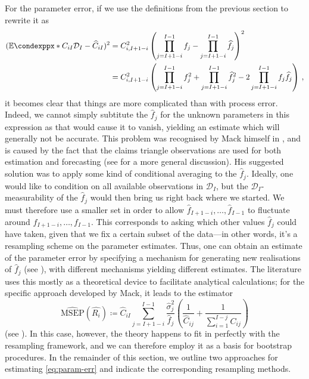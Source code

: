 \documentclass[a4paper]{book}
\begin{document}
For the parameter error, if we use the definitions from the previous section to rewrite it as
\begin{align} \label{eq:param-err}
  (\condexpp*{C_{iI}}{\mathcal{D}_I} - \widehat{C}_{iI})^2 &= C^2_{i, I+1-i} \left( \prod_{j=I+1-i}^{I-1}f_j - \prod_{j=I+1-i}^{I-1}\widehat{f}_j \right)^2 \\
  &= C^2_{i, I+1-i} \left( \prod_{j=I+1-i}^{I-1}f^2_j + \prod_{j=I+1-i}^{I-1}\widehat{f}^2_j - 2 \prod_{j=I+1-i}^{I-1}f_j \widehat{f}_j \right) \,,
\end{align}
it becomes clear that things are more complicated than with process error. Indeed, we cannot simply subtitute the $\widehat{f}_j$ for the unknown parameters in this expression as that would cause it to vanish, yielding an estimate which will generally not be accurate. This problem was recognised by Mack himself in \cite{mack:chain-ladder-variability}, and is caused by the fact that the claims triangle observations are used for both estimation and forecasting (see \cite[Section 2]{lindholm:msep} for a more general discussion). His suggested solution was to apply some kind of conditional averaging to the $\widehat{f}_j$. Ideally, one would like to condition on all available observations in $\mathcal{D}_I$, but the $\mathcal{D}_I$-measurability of the $\widehat{f}_j$ would then bring us right back where we started. We must therefore use a smaller set in order to allow $\widehat{f}_{I + 1 - i}, \dots, \widehat{f}_{I - 1}$ to fluctuate around $f_{I + 1 - i}, \dots, f_{I - 1}$. This corresponds to asking which other values $\widehat{f}_j$ could have taken, given that we fix a certain subset of the data---in other words, it's a resampling scheme on the parameter estimates. Thus, one can obtain an estimate of the parameter error by specifying a mechanism for generating new realisations of $\widehat{f}_j$ (see \cites{wuthrich:chain-ladder-msep}[44 \psqq]{wuthrich:stochastic-reserving}), with different mechanisms yielding different estimates. The literature uses this mostly as a theoretical device to facilitate analytical calculations; for the specific approach developed by Mack, it leads to the estimator
\begin{equation} \label{eq:mack-msep-estimator}
  \widehat{\mathrm{MSEP}}(\widehat{R_i}) \coloneqq \widehat{C}_{iI} \sum_{j = I + 1 - i}^{I - 1} \frac{\widehat{\sigma}^2_j}{\widehat{f}_j} \left( \frac{1}{\widehat{C}_{ij}} + \frac{1}{\sum_{i = 1}^{I - j} C_{ij}} \right)
\end{equation}
(see \cite[11]{mack:chain-ladder-variability}).
In this case, however, the theory happens to fit in perfectly with the resampling framework, and we can therefore employ it as a basis for bootstrap procedures. In the remainder of this section, we outline two approaches for estimating \cref{eq:param-err} and indicate the corresponding resampling methods.
\end{document}
